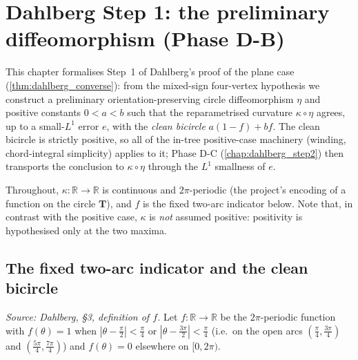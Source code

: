\chapter{Dahlberg Step 1: the preliminary diffeomorphism (Phase D-B)}
\label{chap:dahlberg_step1}


This chapter formalises Step~1 of Dahlberg's proof of the plane case
(\cref{thm:dahlberg_converse}): from the mixed-sign four-vertex hypothesis we
construct a preliminary orientation-preserving circle diffeomorphism $\eta$ and
positive constants $0<a<b$ such that the reparametrised curvature
$\kappa\circ\eta$ agrees, up to a small-$L^1$ error $e$, with the \emph{clean
bicircle} $a(1-f)+bf$. The clean bicircle is strictly positive, so all of the
in-tree positive-case machinery (winding, chord-integral simplicity) applies to
it; Phase D-C (\cref{chap:dahlberg_step2}) then transports the conclusion to
$\kappa\circ\eta$ through the $L^1$ smallness of $e$.

Throughout, $\kappa : \mathbb{R}\to\mathbb{R}$ is continuous and $2\pi$-periodic
(the project's encoding of a function on the circle $\mathbf{T}$), and $f$ is the
fixed two-arc indicator below. Note that, in contrast with the positive case,
$\kappa$ is \emph{not} assumed positive: positivity is hypothesised only at the
two maxima.

\section{The fixed two-arc indicator and the clean bicircle}

\begin{definition}

  \label{def:dahlberg_f}
  \textit{Source: Dahlberg, §3, definition of $f$.}
  Let $f : \mathbb{R}\to\mathbb{R}$ be the $2\pi$-periodic function with
  $f(\theta)=1$ when $|\theta-\tfrac{\pi}{2}|<\tfrac{\pi}{4}$ or
  $|\theta-\tfrac{3\pi}{2}|<\tfrac{\pi}{4}$ (i.e.\ on the open arcs
  $(\tfrac{\pi}{4},\tfrac{3\pi}{4})$ and $(\tfrac{5\pi}{4},\tfrac{7\pi}{4})$) and
  $f(\theta)=0$ elsewhere on $[0,2\pi)$.
\end{definition}

